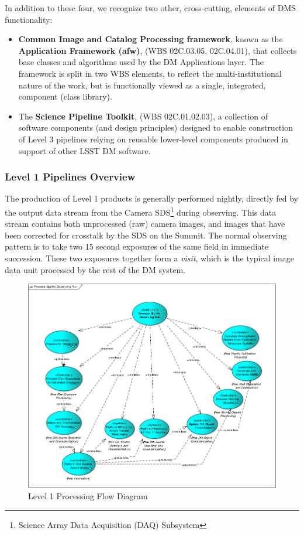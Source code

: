 \documentclass[12pt]{article}
\newcommand{\wbsSPT}{WBS 02C.01.02.03}
\newcommand{\wbsAFW}{WBS 02C.03.05, 02C.04.01}
\begin{document}
\begin{itemize}
\end{itemize}

In addition to these four, we recognize two other, cross-cutting, elements of DMS functionality:

\begin{itemize}
       \item {\bf Common Image and Catalog Processing framework}, known as the {\bf Application Framework (afw)}, (\wbsAFW), that collects base classes and algorithms %
         used by the DM Applications layer. The framework is split in two WBS elements, to reflect the multi-institutional nature of the work, but is functionally viewed as a single, integrated, component (class library).
       \item The {\bf Science Pipeline Toolkit}, (\wbsSPT), a collection of software components (and design principles) designed to enable construction of Level 3 pipelines relying on reusable lower-level components produced in support of other LSST DM software.
\end{itemize}

\subsubsection{Level 1 Pipelines Overview}
The production of Level 1 products is generally performed nightly, directly fed by 
the output data stream from the Camera SDS\footnote{Science Array Data Acquisition (DAQ) Subsystem} during observing. This data stream
contains both unprocessed (raw) camera images, and images that have been corrected
for crosstalk by the SDS on the Summit.  The normal observing
pattern is to take two 15 second exposures of the same field in immediate
succession.  These two exposures together form a {\em visit}, which is the typical
image data unit processed by the rest of the DM system.
\\

\begin{figure}
\includegraphics[angle=0,scale=0.44]{process_nightly_observing_run.png}
\caption{Level 1 Processing Flow Diagram\label{fig:level1}}
\end{figure}
\end{document}
